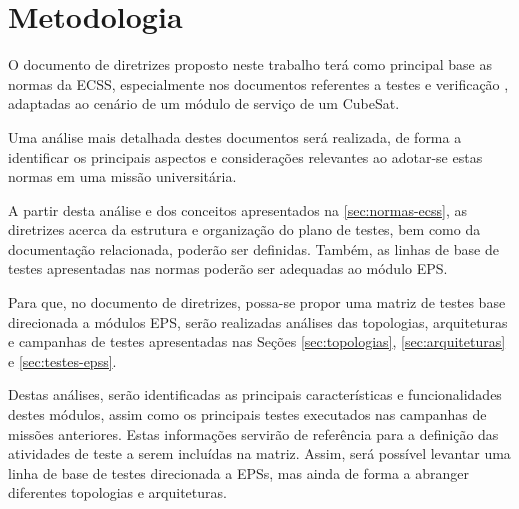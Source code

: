 \chapter{Metodologia}

O documento de diretrizes proposto neste trabalho terá como principal base as normas da \gls{ECSS}, especialmente nos documentos referentes a testes \cite{ecss-e-st-10-03} e verificação \cite{ecss-e-st-10-02}, adaptadas ao cenário de um módulo de serviço de um CubeSat.

Uma análise mais detalhada destes documentos será realizada, de forma a identificar os principais aspectos e considerações relevantes ao adotar-se estas normas em uma missão universitária.

A partir desta análise e dos conceitos apresentados na \autoref{sec:normas-ecss}, as diretrizes acerca da estrutura e organização do plano de testes, bem como da documentação relacionada, poderão ser definidas.
Também, as linhas de base de testes apresentadas nas normas poderão ser adequadas ao módulo \gls{EPS}.


Para que, no documento de diretrizes, possa-se propor uma matriz de testes base direcionada a módulos \gls{EPS}, serão realizadas análises das topologias, arquiteturas e campanhas de testes apresentadas nas Seções \ref{sec:topologias}, \ref{sec:arquiteturas} e \ref{sec:testes-epss}.

Destas análises, serão identificadas as principais características e funcionalidades destes módulos, assim como os principais testes executados nas campanhas de missões anteriores. Estas informações servirão de referência para a definição das atividades de teste a serem incluídas na matriz.
Assim, será possível levantar uma linha de base de testes direcionada a \gls{EPS}s, mas ainda de forma a abranger diferentes topologias e arquiteturas.


